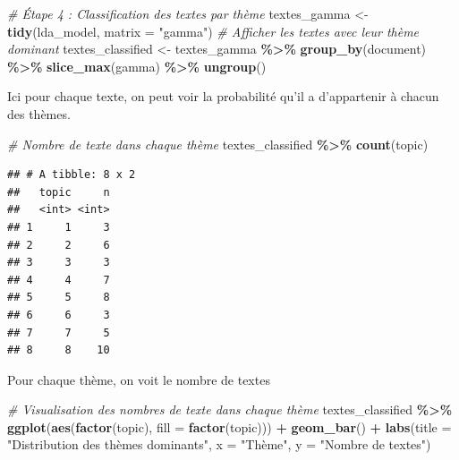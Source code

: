 \documentclass[
]{article}
\newenvironment{Shaded}{\begin{snugshade}}{\end{snugshade}}
\newcommand{\AttributeTok}[1]{\textcolor[rgb]{0.13,0.29,0.53}{#1}}
\newcommand{\CommentTok}[1]{\textcolor[rgb]{0.56,0.35,0.01}{\textit{#1}}}
\newcommand{\FunctionTok}[1]{\textcolor[rgb]{0.13,0.29,0.53}{\textbf{#1}}}
\newcommand{\NormalTok}[1]{#1}
\newcommand{\OtherTok}[1]{\textcolor[rgb]{0.56,0.35,0.01}{#1}}
\newcommand{\SpecialCharTok}[1]{\textcolor[rgb]{0.81,0.36,0.00}{\textbf{#1}}}
\newcommand{\StringTok}[1]{\textcolor[rgb]{0.31,0.60,0.02}{#1}}
\begin{document}
\begin{Shaded}
\begin{Highlighting}[]
\CommentTok{\# Étape 4 : Classification des textes par thème}
\NormalTok{textes\_gamma }\OtherTok{\textless{}{-}} \FunctionTok{tidy}\NormalTok{(lda\_model, }\AttributeTok{matrix =} \StringTok{"gamma"}\NormalTok{)}
\CommentTok{\# Afficher les textes avec leur thème dominant}
\NormalTok{textes\_classified }\OtherTok{\textless{}{-}}\NormalTok{ textes\_gamma }\SpecialCharTok{\%\textgreater{}\%}
  \FunctionTok{group\_by}\NormalTok{(document) }\SpecialCharTok{\%\textgreater{}\%}
  \FunctionTok{slice\_max}\NormalTok{(gamma) }\SpecialCharTok{\%\textgreater{}\%}
  \FunctionTok{ungroup}\NormalTok{()}
\end{Highlighting}
\end{Shaded}

Ici pour chaque texte, on peut voir la probabilité qu'il a d'appartenir
à chacun des thèmes.

\begin{Shaded}
\begin{Highlighting}[]
\CommentTok{\# Nombre de texte dans chaque thème}
\NormalTok{textes\_classified }\SpecialCharTok{\%\textgreater{}\%}
  \FunctionTok{count}\NormalTok{(topic)}
\end{Highlighting}
\end{Shaded}

\begin{verbatim}
## # A tibble: 8 x 2
##   topic     n
##   <int> <int>
## 1     1     3
## 2     2     6
## 3     3     3
## 4     4     7
## 5     5     8
## 6     6     3
## 7     7     5
## 8     8    10
\end{verbatim}

Pour chaque thème, on voit le nombre de textes

\begin{Shaded}
\begin{Highlighting}[]
\CommentTok{\# Visualisation des nombres de texte dans chaque thème}
\NormalTok{textes\_classified }\SpecialCharTok{\%\textgreater{}\%}
  \FunctionTok{ggplot}\NormalTok{(}\FunctionTok{aes}\NormalTok{(}\FunctionTok{factor}\NormalTok{(topic), }\AttributeTok{fill =} \FunctionTok{factor}\NormalTok{(topic))) }\SpecialCharTok{+}
  \FunctionTok{geom\_bar}\NormalTok{() }\SpecialCharTok{+}
  \FunctionTok{labs}\NormalTok{(}\AttributeTok{title =} \StringTok{"Distribution des thèmes dominants"}\NormalTok{,}
       \AttributeTok{x =} \StringTok{"Thème"}\NormalTok{, }\AttributeTok{y =} \StringTok{"Nombre de textes"}\NormalTok{)}
\end{Highlighting}
\end{Shaded}
\end{document}
